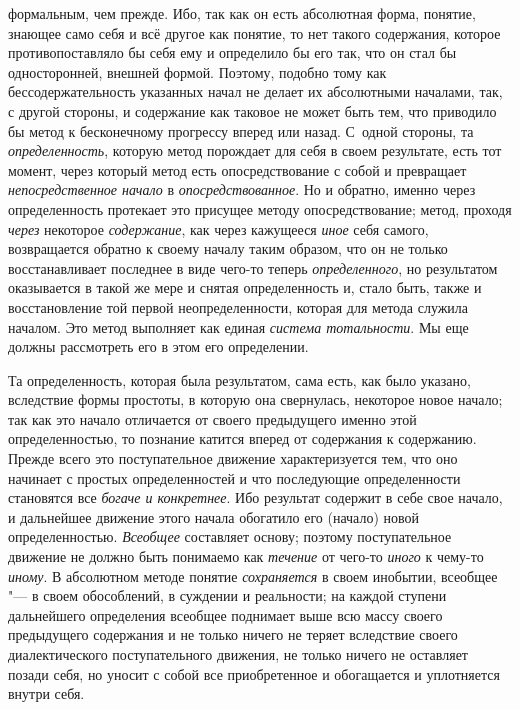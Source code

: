 формальным, чем прежде. Ибо, так как он есть абсолютная форма, понятие,
знающее само себя и всё другое как понятие, то нет такого содержания,
которое противопоставляло бы себя ему и определило бы его так, что он стал
бы односторонней, внешней формой. Поэтому, подобно тому как
бессодержательность указанных начал не делает их абсолютными началами, так,
с другой стороны, и содержание как таковое не может быть
тем, что приводило бы метод к бесконечному прогрессу вперед или назад.
С~одной стороны, та {\em определенность},
которую метод порождает для себя в своем результате, есть тот
момент, через который метод есть опосредствование с собой и превращает
{\em непосредственное начало} в {\em опосредствованное}.
Но и обратно, именно через определенность протекает это
присущее методу опосредствование; метод, проходя
{\em через} некоторое {\em содержание}, как через кажущееся {\em иное}
себя самого, возвращается обратно к своему началу таким
образом, что он не только восстанавливает последнее в виде чего-то теперь
{\em определенного}, но
результатом оказывается в такой же мере и снятая определенность и, стало
быть, также и восстановление той первой неопределенности, которая для
метода служила началом. Это метод выполняет как единая
{\em система тотальности}.
Мы еще должны рассмотреть его в этом его определении.

Та определенность, которая была результатом, сама есть, как
было указано, вследствие формы простоты, в которую она свернулась,
некоторое новое начало; так как это начало отличается от своего предыдущего
именно этой определенностью, то познание катится вперед от содержания к
содержанию. Прежде всего это поступательное движение характеризуется тем,
что оно начинает с простых определенностей и что последующие определенности
становятся все {\em богаче и
конкретнее}. Ибо результат содержит в себе свое начало, и
дальнейшее движение этого начала обогатило его (начало) новой
определенностью. {\em Всеобщее}
составляет основу; поэтому поступательное движение не должно
быть понимаемо как {\em течение} от чего-то {\em иного} к
чему-то {\em иному}. В абсолютном методе понятие {\em сохраняется} в своем
инобытии, всеобщее "--- в своем обособлений, в суждении и
реальности; на каждой ступени дальнейшего определения всеобщее поднимает
выше всю массу своего предыдущего содержания и не только ничего не теряет
вследствие своего диалектического поступательного движения, не только
ничего не оставляет позади себя, но уносит с собой все приобретенное и
обогащается и уплотняется внутри себя.

